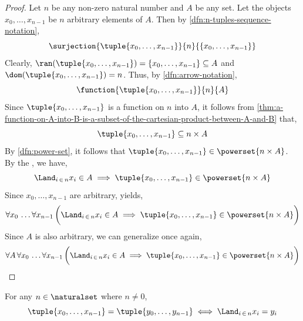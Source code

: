 \begin{proof}
    Let \( n \) be any non-zero natural number and \( A \) be any set.
    Let the objects \( x_{0},\dots,x_{n-1}\) be \( n \) arbitrary elements of \( A \).
    Then by \cref{dfn:n-tuples-sequence-notation},
    \begin{equation*}
        \surjection{ \tuple{x_{0},\dots,x_{n-1}} }{n}{\mleft\{ x_{0},\dots,x_{n-1} \mright\}}
    \end{equation*}
    Clearly, \( \ran(\tuple{x_{0},\dots,x_{n-1}}) = \mleft\{ x_{0},\dots,x_{n-1} \mright\} \subseteq A  \)
    and \( \dom \mleft( \tuple{x_{0}, \dots, x_{n-1}} \mright) = n \). Thus, by \cref{dfn:arrow-notation},
    \begin{equation*}
        \function{\tuple{x_{0},\dots,x_{n-1}}}{n}{A}
    \end{equation*}
    Since \( \tuple{x_{0},\dots,x_{n-1}} \) is a function on \( n \) into \( A \),
    it follows from \cref{thm:a-function-on-A-into-B-is-a-subset-of-the-cartesian-product-between-A-and-B}
    that,
    \begin{equation*}
        \tuple{x_{0},\dots,x_{n-1}} \subseteq n \times A
    \end{equation*}
    By \cref{dfn:power-set}, it follows that \( \tuple{x_{0},\dots,x_{n-1}} \in \powerset{n \times A} \).
    By the , we have,
    \begin{equation*}
        \Land_{i \,\in\, n} x_{i} \in A \implies \tuple{x_{0}, \dots, x_{n-1}} \in \powerset{n \times A}
    \end{equation*}
    Since \( x_{0},\dots,x_{n-1} \) are arbitrary,  yields,
    \begin{equation*}
        \forall x_{0} \, \dots \forall x_{n-1} \, \bigg( \Land_{i \,\in\, n} x_{i} \in A \implies \tuple{x_{0}, \dots, x_{n-1}} \in \powerset{n \times A} \bigg)
    \end{equation*}
    Since \( A \) is also arbitrary, we can generalize once again,
    \begin{equation*}
        \forall A \, \forall x_{0} \, \dots \forall x_{n-1} \, \bigg( \Land_{i \,\in\, n} x_{i} \in A \implies \tuple{x_{0}, \dots, x_{n-1}} \in \powerset{n \times A} \bigg)
        \qedhere
    \end{equation*}
\end{proof}

\begin{thm}[Equality]
    \label{thm:tuple-equality}
    For any \( n \in \naturalset \) where \( n \neq 0 \),
    \begin{equation*}
        \tuple{x_{0},\dots,x_{n-1}} = \tuple{y_{0},\dots,y_{n-1}} \iff \Land_{i \,\in\, n} x_{i} = y_{i}
    \end{equation*}
\end{thm}

